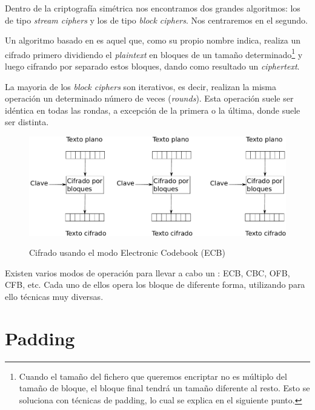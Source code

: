 Dentro de la criptografía simétrica nos encontramos dos grandes algoritmos: los de tipo \emph{stream ciphers} y los de tipo \emph{block ciphers}.
 Nos centraremos en el segundo.

 Un algoritmo basado en  es aquel que, como su propio nombre indica,
 realiza un cifrado primero dividiendo el \emph{plaintext} en bloques de un tamaño determinado\footnote{Cuando el tamaño del fichero que queremos encriptar no es múltiplo del tamaño de bloque, el bloque final tendrá un tamaño diferente al resto. Esto se soluciona con técnicas de padding, lo cual se explica en el siguiente punto.}
 y luego cifrando por separado estos bloques, dando como resultado un \emph{ciphertext}.

 La mayoria de los \emph{block ciphers} son iterativos, es decir, realizan la misma operación un determinado número de veces (\emph{rounds}).
 Esta operación suele ser idéntica en todas las rondas, a excepción de la primera o la última, donde suele ser distinta.

 \begin{figure}[ht]
   \centering
   \includegraphics[scale=0.4]{Figures/ECB}
   \decoRule
   \caption[Electronic Codebook (ECB)]{Cifrado usando el modo Electronic Codebook (ECB)} \emph{\parencite{Reference22}}
   \label{fig:ECB}
 \end{figure}

 Existen varios modos de operación para llevar a cabo un : ECB, CBC, OFB, CFB, etc.
 Cada uno de ellos opera los bloque de diferente forma, utilizando para ello técnicas muy diversas. \emph{\parencite{Reference21}}


 \section{Padding}

